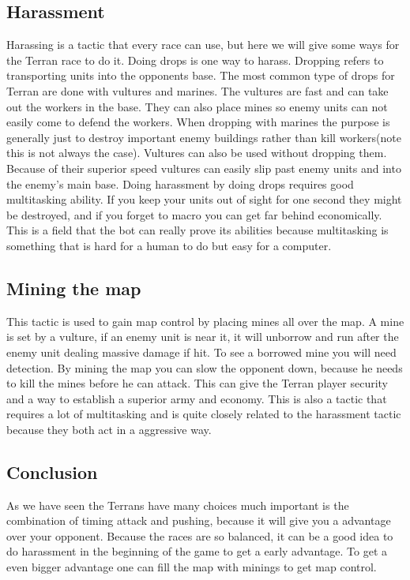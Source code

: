 	\subsection{Harassment}
		Harassing is a tactic that every race can use, but here we will give some ways for the Terran race to do it. 
		Doing drops is one way to harass. Dropping refers to transporting units into the opponents base. 
		The most common type of drops for Terran are done with vultures and marines. The vultures are fast and can take out the workers in the base. 
		They can also place mines so enemy units can not easily come to defend the workers. When dropping with marines 
		the purpose is generally just to destroy important enemy buildings rather than kill workers(note this is not always the case). 
		Vultures can also be used without dropping them. 
		Because of their superior speed vultures can easily slip past enemy units and into the enemy's main base. Doing harassment by doing drops requires 
		good multitasking ability. If you keep your units out of sight for one second they might be destroyed, 
		and if you forget to macro you can get far behind economically. 
		This is a field that the bot can really prove its abilities because 
		multitasking is something that is hard for a human to do but easy for a computer.
	
	\subsection{Mining the map}
		This tactic is used to gain map control by placing mines all over the map. A mine is set by a vulture, 
		if an enemy unit is near it, it will unborrow and run after the enemy unit dealing massive damage if hit. To see a borrowed mine you will need 
		detection. By mining the map you can slow the opponent down, because he needs to kill the mines before he can attack. 
		This can give the Terran player security and a way to establish a superior army and economy. 
		This is also a tactic that requires a lot of multitasking and is quite closely related to the harassment tactic because they both act in a 
		aggressive way.
	
	\subsection{Conclusion}
		As we have seen the Terrans have many choices much important is the combination of timing attack and pushing, because it will give you
		a advantage over your opponent. Because the races are so balanced, it can be a good idea to do harassment in the beginning of the game
		to get a early advantage. To get a even bigger advantage one can fill the map with minings to get map control.